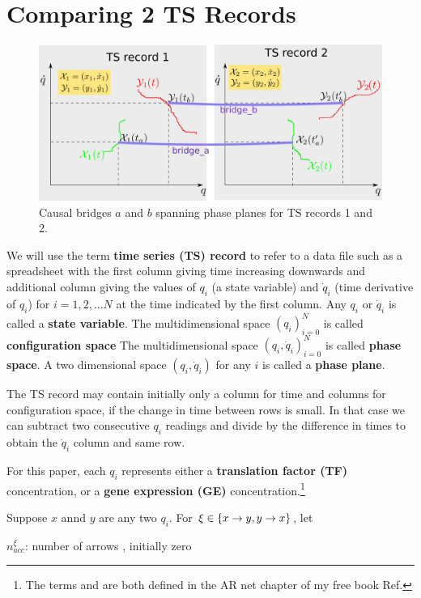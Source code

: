 \documentclass[12pt]{article}
\begin{document}
\section{Comparing 2 TS Records}
\begin{figure}[h!]
\centering
\includegraphics[width=5in]
{two-phase-plane-bridges.png}
\caption{Causal bridges $a$ and $b$ spanning
	phase planes for
TS records 1 and 2.}
\label{fig-two-phase-plane-bridges}
\end{figure}

We will use the term {\bf time series (TS) record}
to refer to
a data file such as a spreadsheet with the first column 
giving time increasing downwards and additional column giving the values
of $q_i$ (a state variable) and $\dot{q}_i$ (time derivative of $q_i$) for $i=1, 2, \ldots N$
at the time indicated by the first column.
Any $q_i$ or $\dot{q}_i$ is called a {\bf state variable}.
The multidimensional space $(q_i)_{i=0}^{N}$
is called {\bf configuration space}
The multidimensional space $(q_i, \dot{q}_i)_{i=0}^{N}$
is called {\bf phase space}.
A two dimensional space $(q_i, \dot{q}_i)$ for any 
$i$ is called a {\bf phase plane}.

The TS record may contain initially only a column 
for time and columns for configuration space,
if the change in time between rows is small. 
In that case we can subtract two consecutive
$q_i$ readings and divide by the difference
in times to obtain the $\dot{q}_i$ column
and same row.

For this paper, each $q_i$ represents either a {\bf translation
factor (TF)} concentration, or a {\bf gene expression (GE)} concentration.\footnote{The 
terms 
and  are both defined
in the AR net chapter of my free book Ref.\cite{Bayesuvius}}


Suppose $x$ annd $y$
are any two $q_i$. For $\xi \in\{x\rightarrow y, y\rightarrow x\}$, let

$n_{acc}^{\xi}$: number of arrows , initially zero
\end{document}
